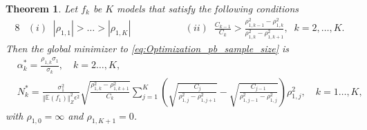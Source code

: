 \documentclass[final,3p,times,11pt]{elsarticle}
\newtheorem{theorem}{Theorem}%
\begin{document}
\begin{theorem}
\label{thm:Sample_size_est}
Let $f_k$ be $K$ models that satisfy the following conditions
%
\begin{alignat*}{8}
    &(i)\;\; |\rho_{1,1}|>\ldots>|\rho_{1,K}|& \qquad \qquad
    &(ii)\;\; \frac{C_{k-1}}{C_k}>\frac{\rho_{1,k-1}^2-\rho_{1,k}^2}{\rho_{1,k}^2-\rho_{1,k+1}^2},\;\;k=2,\ldots,K.
\end{alignat*}
%
Then the global minimizer to \eqref{eq:Optimization_pb_sample_size} is 
\begin{align*}
    &\alpha_k^*=\frac{\rho_{1,k}\sigma_1}{\sigma_k}, \quad k=2\ldots, K,\\
    &N_k^*=\frac{\sigma_1^2}{\left\Vert\mathbb{E}(f_1) \right\Vert_{Z}^2\epsilon^2}\sqrt{\frac{\rho_{1,k}^2 - \rho_{1,k+1}^2}{C_k}}\sum_{j=1}^K\left(\sqrt{\frac{C_j}{\rho_{1,j}^2 - \rho_{1,j+1}^2}} - \sqrt{\frac{C_{j-1}}{\rho_{1,{j-1}}^2 - \rho_{1,j}^2}}\right)\rho_{1,j}^2, \quad k=1\ldots, K,
\end{align*}
with $\rho_{1,0}=\infty$ and $\rho_{1,K+1}=0$.

\end{theorem}
\end{document}
